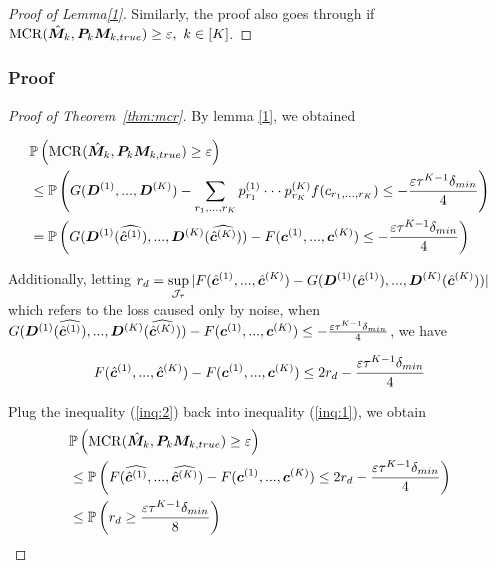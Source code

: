 \documentclass{article}
\DeclareMathOperator*{\mcr}{MCR}
\begin{document}
\begin{appendices}
\begin{proof}[Proof of Lemma\ref{1}]
Similarly, the proof also goes through if $\mcr(\hat{\mM}_k, \mP_k\mM_{k,true})\geq \varepsilon,~k\in[K]$.
\end{proof}

\subsubsection{Proof}
\begin{proof}[Proof of Theorem~\ref{thm:mcr}]
By lemma \ref{1}, we obtained 

\begin{equation}\label{inq:1}
\begin{split}
    &\mathbb{P}\left(\mcr(\hat{\mM}_k, \mP_k\mM_{k,true})\geq \varepsilon\right)\\
    &\leq\mathbb{P}\left( G(\mD^{(1)},...,\mD^{(K)})-\displaystyle\sum_{r_1,...,r_K}p_{r_1}^{(1)}\cdot\cdot\cdot p_{r_K}^{(K)}f(c_{r_1,...,r_K})\leq -\frac{\varepsilon\tau^{K-1}\delta_{min}}{4}\right)\\
    &=\mathbb{P}\left(G(\mD^{(1)}(\widehat{\hmc^{(1)}}),...,\mD^{(K)}(\widehat{\hmc^{(K)}}))-F(\mc^{(1)},...,\mc^{(K)})\leq -\frac{\varepsilon\tau^{K-1}\delta_{min}}{4}\right)
\end{split}
\end{equation}


Additionally, letting $r_d=\displaystyle\sup_{\mathcal{J}_\tau} |F(\hat{\boldsymbol{c}}^{(1)},...,\hat{\boldsymbol{c}}^{(K)})-G(\boldsymbol{D}^{(1)}(\hat{\boldsymbol{c}}^{(1)}),...,\boldsymbol{D}^{(K)}(\hat{\boldsymbol{c}}^{(K)}))|$ which refers to the loss caused only by noise, when $G(\boldsymbol{D}^{(1)}(\widehat{\hat{\boldsymbol{c}}^{(1)}}),...,\boldsymbol{D}^{(K)}(\widehat{\hat{\boldsymbol{c}}^{(K)}}))-F(\boldsymbol{c}^{(1)},...,\boldsymbol{c}^{(K)})\leq -\frac{\varepsilon\tau^{K-1}\delta_{min}}{4}$, we have

\begin{equation} \label{inq:2}
    F(\hat{\boldsymbol{c}}^{(1)},...,\hat{\boldsymbol{c}}^{(K)})-F(\boldsymbol{c}^{(1)},...,\boldsymbol{c}^{(K)})\leq2r_d-\frac{\varepsilon\tau^{K-1}\delta_{min}}{4}
\end{equation}

Plug the inequality (\eqref{inq:2}) back into inequality (\eqref{inq:1}), we obtain
\begin{equation}\label{inq:3}
\begin{split}
    &\mathbb{P}\left(\mcr(\hat{\mM}_k, \mP_k\mM_{k,true})\geq \varepsilon\right)\\
    &\leq \mathbb{P}\left(F(\widehat{\hmc^{(1)}},...,\widehat{\hmc^{(K)}})-F(\mc^{(1)},...,\mc^{(K)})\leq 2r_d-\frac{\varepsilon\tau^{K-1}\delta_{min}}{4}\right)\\
    &\leq\mathbb{P}\left(r_d\geq\frac{\varepsilon\tau^{K-1}\delta_{min}}{8}\right)
\end{split}
\end{equation}


\end{proof}
\end{appendices}
\end{document}

